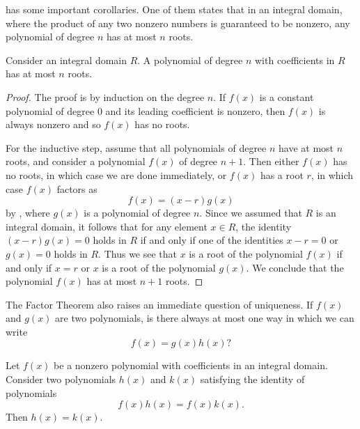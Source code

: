  has some important corollaries. One of them states that in an integral domain, where the product of any two nonzero numbers is guaranteed to be nonzero, any polynomial of degree $n$ has at most $n$ roots.

\begin{corollary}\label{corollary:number-of-roots-polynomial}
  Consider an integral domain $R$. A polynomial of degree $n$ with coefficients in $R$ has at most $n$ roots.
\end{corollary}

\begin{proof}
  The proof is by induction on the degree $n$. If $f(x)$ is a constant polynomial of degree $0$ and its leading coefficient is nonzero, then $f(x)$ is always nonzero and so $f(x)$ has no roots.

  For the inductive step, assume that all polynomials of degree $n$ have at most $n$ roots, and consider a polynomial $f(x)$ of degree $n+1$. Then either $f(x)$ has no roots, in which case we are done immediately, or $f(x)$ has a root $r$, in which case $f(x)$ factors as
  \begin{equation*}
    f(x)=(x-r)g(x)
  \end{equation*}
  by , where $g(x)$ is a polynomial of degree $n$. Since we assumed that $R$ is an integral domain, it follows that for any element $x\in R$, the identity $(x-r)g(x)=0$ holds in $R$ if and only if one of the identities $x-r=0$ or $g(x)=0$ holds in $R$. Thus we see that $x$ is a root of the polynomial $f(x)$ if and only if $x=r$ or $x$ is a root of the polynomial $g(x)$. We conclude that the polynomial $f(x)$ has at most $n+1$ roots.
\end{proof}

The Factor Theorem also raises an immediate question of uniqueness. If $f(x)$ and $g(x)$ are two polynomials, is there always at most one way in which we can write
\begin{equation*}
  f(x)=g(x)h(x)?
\end{equation*}

\begin{proposition}\label{proposition:cancellation-law-polynomials}
  Let $f(x)$ be a nonzero polynomial with coefficients in an integral domain. Consider two polynomials $h(x)$ and $k(x)$ satisfying the identity of polynomials
  \begin{equation*}
    f(x)h(x)=f(x)k(x).
  \end{equation*}
  Then $h(x)=k(x)$. 
\end{proposition}

